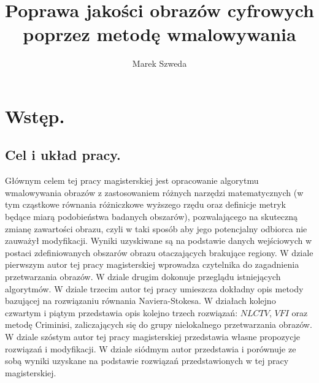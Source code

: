 \documentclass[a4paper,12pt,twoside,openany]{report}
\title{Poprawa jakości obrazów cyfrowych poprzez metodę wmalowywania}
\author{Marek Szweda}
\begin{document}
\maketitle

\thispagestyle{empty}
\newpage
\setcounter{page}{1}
\setcounter{secnumdepth}{3}

\newpage
\printunsrtglossary[type=symbols, style=long, title={Wykaz oznaczeń i symboli}]

\chapter{Wstęp.}
\section{Cel i układ pracy.}
Głównym celem tej pracy magisterskiej jest opracowanie algorytmu wmalowywania obrazów z zastosowaniem różnych narzędzi matematycznych (w tym cząstkowe równania różniczkowe wyższego rzędu oraz definicje metryk będące miarą podobieństwa badanych obszarów), pozwalającego na skuteczną zmianę zawartości obrazu, czyli w taki sposób aby jego potencjalny odbiorca nie zauważył modyfikacji.
Wyniki uzyskiwane są na podstawie danych wejściowych w postaci zdefiniowanych obszarów obrazu otaczających brakujące regiony.
W dziale pierwszym autor tej pracy magisterskiej wprowadza czytelnika do zagadnienia przetwarzania obrazów. W dziale drugim dokonuje przeglądu istniejących algorytmów. W dziale trzecim autor tej pracy umieszcza dokładny opis metody bazującej  na rozwiązaniu równania Naviera-Stokesa. W działach kolejno czwartym i piątym przedstawia opis kolejno trzech rozwiązań: $NLCTV$,  $VFI$ oraz metodę Criminisi, zaliczających się do grupy nielokalnego przetwarzania obrazów. W dziale szóstym autor tej pracy magisterskiej przedstawia własne propozycje rozwiązań i modyfikacji. W dziale siódmym autor przedstawia i porównuje ze sobą wyniki uzyskane na podstawie rozwiązań przedstawionych w tej pracy magisterskiej.
\end{document}
